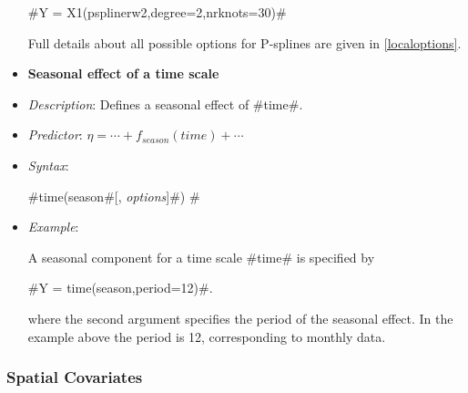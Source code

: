 \begin{itemize}
#Y = X1(psplinerw2,degree=2,nrknots=30)#

Full details about all possible options for P-splines are given in
\autoref{localoptions}.

\item[] {\bf\sffamily Seasonal effect of a time scale}

\item[] {\em Description}: Defines a seasonal effect of #time#.
\item[] {\em Predictor}: $\eta =  \cdots + f_{season}(time) +
\cdots $ \item[] {\em Syntax}:

#time(season#[, {\em options}]#) #
\item[] {\em Example}:

A seasonal component for a time scale #time# is specified by

#Y = time(season,period=12)#.

where the second argument specifies the period of the seasonal
effect. In the example above the period is 12, corresponding to
monthly data.
\end{itemize}


\subsubsection*{Spatial Covariates}

